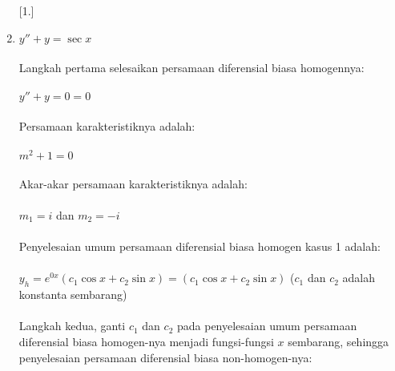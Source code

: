 \begin{enumerate} [1.]
	\item \begin{math} y'' + y = \sec x \end{math} \\ \\
	Langkah pertama selesaikan persamaan diferensial biasa homogennya: \\ \\
	\begin{math} y'' + y = 0 = 0 \end{math} \\ \\
	Persamaan karakteristiknya adalah:  \\ \\
	\begin{math} m^{2} + 1 = 0 \end{math} \\ \\
	Akar-akar persamaan karakteristiknya adalah: \\ \\
	\begin{math} m_1 = i \end{math} dan \begin{math} m_2 = -i \end{math} \\ \\
	Penyelesaian umum persamaan diferensial biasa homogen kasus 1 adalah: \\ \\
	\begin{math} y_h = e^{0x} (c_1 \cos x + c_2 \sin x) = (c_1 \cos x + c_2 \sin x)  \end{math} (\begin{math} c_1 \end{math} dan \begin{math} c_2 \end{math} adalah konstanta sembarang) \\ \\
	Langkah kedua, ganti \begin{math} c_1 \end{math} dan \begin{math} c_2 \end{math} pada penyelesaian umum persamaan diferensial biasa homogen-nya menjadi fungsi-fungsi \begin{math} x \end{math} sembarang, sehingga penyelesaian persamaan diferensial biasa non-homogen-nya: \\ \\

\end{enumerate}
